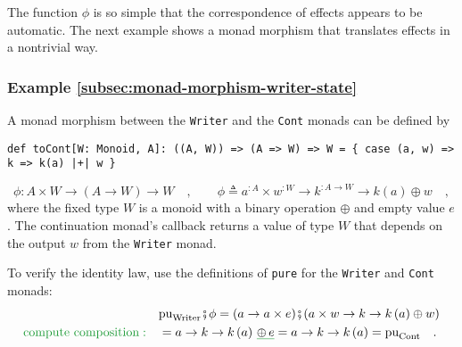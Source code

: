 The function $\phi$ is so simple that the correspondence of effects
appears to be automatic. The next example shows a monad morphism that
translates effects in a nontrivial way.

\subsubsection{Example \label{subsec:monad-morphism-writer-state}\ref{subsec:monad-morphism-writer-state}}

A monad morphism between the \lstinline!Writer! and the \lstinline!Cont!
monads can be defined by
\begin{lstlisting}
def toCont[W: Monoid, A]: ((A, W)) => (A => W) => W = { case (a, w) => k => k(a) |+| w }
\end{lstlisting}
\[
\phi:A\times W\rightarrow\left(A\rightarrow W\right)\rightarrow W\quad,\quad\quad\phi\triangleq a^{:A}\times w^{:W}\rightarrow k^{:A\rightarrow W}\rightarrow k\left(a\right)\oplus w\quad,
\]
where the fixed type $W$ is a monoid with a binary operation $\oplus$
and empty value $e$. The continuation monad\textsf{'}s callback returns a
value of type $W$ that depends on the output $w$ from the \lstinline!Writer!
monad.

To verify the identity law, use the definitions of \lstinline!pure!
for the \lstinline!Writer! and \lstinline!Cont! monads:
\begin{align*}
 & \text{pu}_{\text{Writer}}\bef\phi=(a\rightarrow a\times e)\bef(a\times w\rightarrow k\rightarrow k\left(a\right)\oplus w)\\
{\color{greenunder}\text{compute composition}:}\quad & =a\rightarrow k\rightarrow k\left(a\right)\,\gunderline{\oplus\,e}=a\rightarrow k\rightarrow k\left(a\right)=\text{pu}_{\text{Cont}}\quad.
\end{align*}

